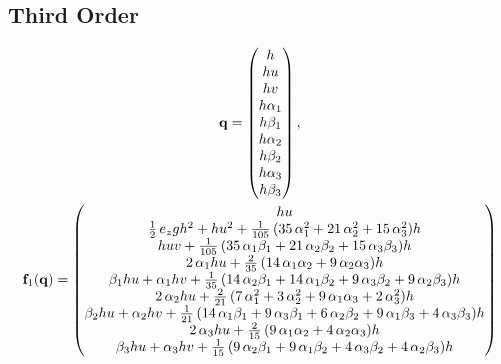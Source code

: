 \documentclass{article}
\begin{document}
    \subsection{Third Order}

      \begin{gather}
        \mathbf{q} =
        \begin{pmatrix}
          h \\
          hu \\
          hv \\
          h \alpha_1 \\
          h \beta_1 \\
          h \alpha_2 \\
          h \beta_2 \\
          h \alpha_3 \\
          h \beta_3
        \end{pmatrix}, \\
        \mathbf{f}_1(\mathbf{q}) =
        \begin{pmatrix}
          h u \\
          \frac{1}{2} \, e_{z} g h^{2} + h u^{2} + \frac{1}{105} \, {(35 \, \alpha_{1}^{2} + 21 \, \alpha_{2}^{2} + 15 \, \alpha_{3}^{2})} h \\
          h u v + \frac{1}{105} \, {(35 \, \alpha_{1} \beta_{1} + 21 \, \alpha_{2} \beta_{2} + 15 \, \alpha_{3} \beta_{3})} h \\
          2 \, \alpha_{1} h u + \frac{2}{35} \, {(14 \, \alpha_{1} \alpha_{2} + 9 \, \alpha_{2} \alpha_{3})} h \\
          \beta_{1} h u + \alpha_{1} h v + \frac{1}{35} \, {(14 \, \alpha_{2} \beta_{1} + 14 \, \alpha_{1} \beta_{2} + 9 \, \alpha_{3} \beta_{2} + 9 \, \alpha_{2} \beta_{3})} h \\
          2 \, \alpha_{2} h u + \frac{2}{21} \, {(7 \, \alpha_{1}^{2} + 3 \, \alpha_{2}^{2} + 9 \, \alpha_{1} \alpha_{3} + 2 \, \alpha_{3}^{2})} h \\
          \beta_{2} h u + \alpha_{2} h v + \frac{1}{21} \, {(14 \, \alpha_{1} \beta_{1} + 9 \, \alpha_{3} \beta_{1} + 6 \, \alpha_{2} \beta_{2} + 9 \, \alpha_{1} \beta_{3} + 4 \, \alpha_{3} \beta_{3})} h \\
          2 \, \alpha_{3} h u + \frac{2}{15} \, {(9 \, \alpha_{1} \alpha_{2} + 4 \, \alpha_{2} \alpha_{3})} h \\
          \beta_{3} h u + \alpha_{3} h v + \frac{1}{15} \, {(9 \, \alpha_{2} \beta_{1} + 9 \, \alpha_{1} \beta_{2} + 4 \, \alpha_{3} \beta_{2} + 4 \, \alpha_{2} \beta_{3})} h

\end{pmatrix}
\end{gather}
\end{document}
